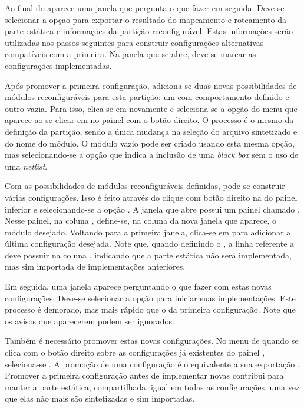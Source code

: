 \documentclass[11pt,a4paper,oneside]{book}
\begin{document}
Ao final do  aparece uma janela que pergunta o que fazer em seguida.
Deve-se selecionar a opçao  para exportar o resultado do mapeamento e roteamento da parte estática e informações da partição reconfigurável.
Estas informações serão utilizadas nos passos seguintes para construir configurações alternativas compatíveis com a primeira.
Na janela que se abre, deve-se marcar as configurações implementadas.

Após promover a primeira configuração, adiciona-se duas novas possibilidades de módulos reconfiguráveis para esta partição: um com comportamento definido e outro vazia.
Para isso, clica-se em  novamente e seleciona-se a opção  do menu que aparece ao se clicar em  no painel  com o botão direito.
O processo é o mesmo da definição da partição, sendo a única mudança na seleção do arquivo sintetizado e do nome do módulo.
O módulo vazio pode ser criado usando esta mesma opção, mas selecionando-se a opção que indica a inclusão de uma \textit{black box} sem o uso de uma \textit{netlist}.

Com as possibilidades de módulos reconfiguráveis definidas, pode-se construir várias configurações.
Isso é feito através do clique com botão direito na  do painel inferior e selecionando-se a opção .
A janela que abre possui um painel chamado .
Nesse painel, na coluna , define-se, na coluna  da nova janela que aparece, o módulo desejado.
Voltando para a primeira janela, clica-se em  para adicionar a última configuração desejada.
Note que, quando definindo o , a linha referente a  deve possuir  na coluna , indicando que a parte estática não será implementada, mas sim importada de implementações anteriores.

Em seguida, uma janela aparece perguntando o que fazer com estas novas configurações.
Deve-se selecionar a opção  para iniciar suas implementações.
Este processo é demorado, mas mais rápido que o da primeira configuração.
Note que os avisos que aparecerem podem ser ignorados.

Também é necessário promover estas novas configurações.
No menu de quando se clica com o botão direito sobre as configurações já existentes do painel , seleciona-se .
A promoção de uma configuração é o equivalente a sua exportação \cite{ug748}.
Promover a primeira configuração antes de implementar novas contribui para manter a parte estática, compartilhada, igual em todas as configurações, uma vez que elas não mais são sintetizadas e sim importadas.
\end{document}

